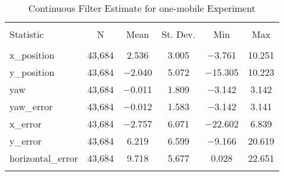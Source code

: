 
\begin{table}[h] \centering 
  \caption{Continuous Filter Estimate for one-mobile Experiment} 
  \label{tab:one_mobile_continuous_summary} 
\begin{tabular}{@{\extracolsep{5pt}}lccccc} 
\\[-1.8ex]\hline 
\hline \\[-1.8ex] 
Statistic & \multicolumn{1}{c}{N} & \multicolumn{1}{c}{Mean} & \multicolumn{1}{c}{St. Dev.} & \multicolumn{1}{c}{Min} & \multicolumn{1}{c}{Max} \\ 
\hline \\[-1.8ex] 
x\_position & 43,684 & 2.536 & 3.005 & $-$3.761 & 10.251 \\ 
y\_position & 43,684 & $-$2.040 & 5.072 & $-$15.305 & 10.223 \\ 
yaw & 43,684 & $-$0.011 & 1.809 & $-$3.142 & 3.142 \\ 
yaw\_error & 43,684 & $-$0.012 & 1.583 & $-$3.142 & 3.141 \\ 
x\_error & 43,684 & $-$2.757 & 6.071 & $-$22.602 & 6.839 \\ 
y\_error & 43,684 & 6.219 & 6.599 & $-$9.166 & 20.619 \\ 
horizontal\_error & 43,684 & 9.718 & 5.677 & 0.028 & 22.651 \\ 
\hline \\[-1.8ex] 
\end{tabular} 
\end{table} 
